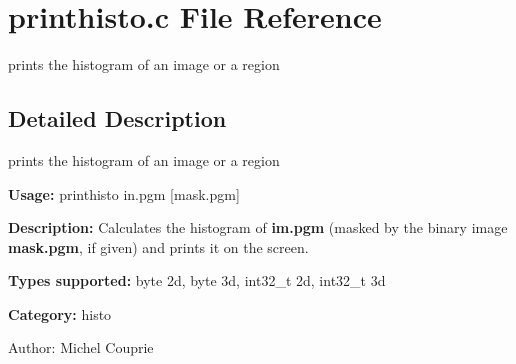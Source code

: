 \section{printhisto.c File Reference}
\label{printhisto_8c}
prints the histogram of an image or a region 



\subsection{Detailed Description}
prints the histogram of an image or a region 

{\bf Usage:} printhisto in.pgm [mask.pgm]

{\bf Description:} Calculates the histogram of {\bf im.pgm} (masked by the binary image {\bf mask.pgm}, if given) and prints it on the screen.

{\bf Types supported:} byte 2d, byte 3d, int32\_\-t 2d, int32\_\-t 3d

{\bf Category:} histo

\begin{Desc}
\item[Author:]Michel Couprie \end{Desc}

